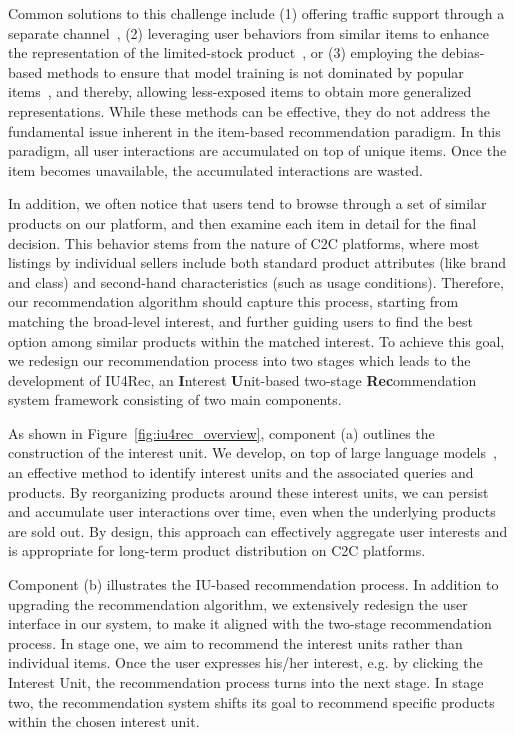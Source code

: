 Common solutions to this challenge include (1) offering traffic support through a separate channel~\cite{wu2022adversarial,poso, cold_cross_domain}, (2) leveraging user behaviors from similar items to enhance the representation of the limited-stock product~\cite{wu2024metasplit,cold_graph,meta_emb}, or (3) employing the debias-based methods to ensure that model training is not dominated by popular items~\cite{logq, class_re}, and thereby, allowing less-exposed items to obtain more generalized representations. 
While these methods can be effective, they do not address the fundamental issue inherent in the item-based recommendation paradigm. In this paradigm, all user interactions are accumulated on top of unique items. Once the item becomes unavailable, the accumulated interactions are wasted.

In addition, we often notice that users tend to browse through a set of similar products on our platform, and then examine each item in detail for the final decision. This behavior stems from the nature of C2C platforms, where most listings by individual sellers include both standard product attributes (like brand and class) and second-hand characteristics (such as usage conditions). Therefore, our recommendation algorithm should capture this process, starting from matching the broad-level interest, and further guiding users to find the best option among similar products within the matched interest. To achieve this goal, we redesign our recommendation process into two stages which leads to the development of IU4Rec, an \textbf{I}nterest \textbf{U}nit-based two-stage \textbf{Rec}ommendation system framework consisting of two main components.

As shown in Figure~\ref{fig:iu4rec_overview}, component (a) outlines the construction of the interest unit. We develop, on top of large language models~\cite{Tay2022TransformerMA}, an effective method to identify interest units and the associated queries and products. By reorganizing products around these interest units, we can persist and accumulate user interactions over time, even when the underlying products are sold out. By design, this approach can effectively aggregate user interests and is appropriate for long-term product distribution on C2C platforms.

Component (b) illustrates the IU-based recommendation process. In addition to upgrading the recommendation algorithm, we extensively redesign the user interface in our system, to make it aligned with the two-stage recommendation process. In stage one, we aim to recommend the interest units rather than individual items. Once the user expresses his/her interest, e.g. by clicking the Interest Unit, the recommendation process turns into the next stage. In stage two, the recommendation system shifts its goal to recommend specific products within the chosen interest unit. 



